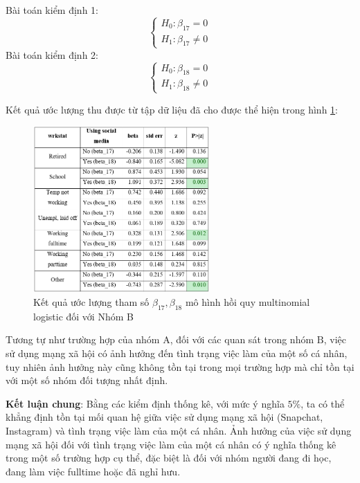Bài toán kiểm định 1:
$$
\left\{\begin{array}{l}
H_{0}: \beta_{17}=0 \\
H_{1}: \beta_{17} \neq 0
\end{array}\right.
$$
Bài toán kiểm định 2:
$$
\left\{\begin{array}{l}
H_{0}: \beta_{18}=0 \\
H_{1}: \beta_{18} \neq 0
\end{array}\right.
$$

Kết quả ước lượng thu được từ tập dữ liệu đã cho được thể hiện trong hình \ref{fig:beta1718}:

\begin{figure}[h!]
    \centering
    \includegraphics[width=0.6\textwidth]{figures/beta1718.png}
    \caption{Kết quả ước lượng tham số $\beta_{17}, \beta_{18}$ mô hình hồi quy multinomial logistic đối với Nhóm B}
    \label{fig:beta1718}
\end{figure}

Tương tự như trường hợp của nhóm $\mathrm{A}$, đối với các quan sát trong nhóm $\mathrm{B}$, việc sử dụng mạng xã hội có ảnh hưởng đến tình trạng việc làm của một số cá nhân, tuy nhiên ảnh hưởng này cũng không tồn tại trong mọi trường hợp mà chỉ tồn tại với một số nhóm đối tượng nhất định.


\textbf{Kết luận chung}: Bằng các kiểm định thống kê, với mức ý nghĩa $5 \%$, ta có thể khẳng định tồn tại mối quan hệ giữa việc sử dụng mạng xã hội (Snapchat, Instagram) và tình trạng việc làm của một cá nhân. Ảnh hưởng của việc sử dụng mạng xã hội đối với tình trạng việc làm của một cá nhân có ý nghĩa thống kê trong một số trường hợp cụ thể, đặc biệt là đối với nhóm người đang đi học, đang làm việc fulltime hoặc đã nghỉ hưu.
